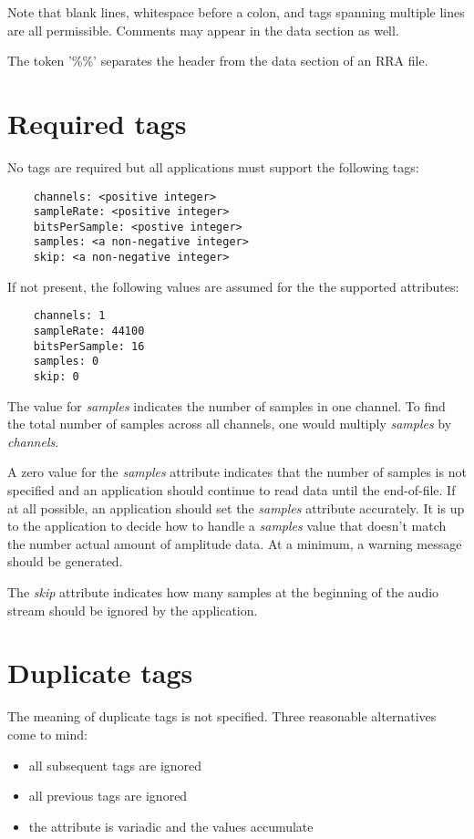 \documentclass{article}
\begin{document}
Note that blank lines, whitespace before a colon, and
tags spanning multiple lines are all permissible. Comments
may appear in the data section as well.

The token '\%\%' separates the header from the data section
of an RRA file.

\section{Required tags}

No tags are required but all applications must support the following tags:

\begin{verbatim}
    channels: <positive integer>
    sampleRate: <positive integer>
    bitsPerSample: <postive integer>
    samples: <a non-negative integer>
    skip: <a non-negative integer>
\end{verbatim}

If not present, the following values are assumed for the
the supported attributes:

\begin{verbatim}
    channels: 1
    sampleRate: 44100
    bitsPerSample: 16
    samples: 0
    skip: 0
\end{verbatim}

The value for {\it samples} indicates the number of samples
in one channel. To find the total number of samples
across all channels, one would multiply {\it samples} by
{\it channels}.

A zero value for the {\it samples} attribute indicates that
the number of samples is not specified and an application
should continue to read data until the end-of-file. If at
all possible, an application should set the {\it samples} attribute
accurately. It is up to the application to decide how
to handle a {\it samples} value that doesn't match the number
actual amount of amplitude data. At a minimum, a warning
message should be generated.

The {\it skip} attribute indicates how many samples at the beginning
of the audio stream should be ignored by the application.

\section{Duplicate tags}

The meaning of duplicate tags is not specified. Three reasonable
alternatives come to mind:

\begin{itemize}
\item
    all subsequent tags are ignored
\item
    all previous tags are ignored
\item
    the attribute is variadic and the values accumulate
\end{itemize}
\end{document}
